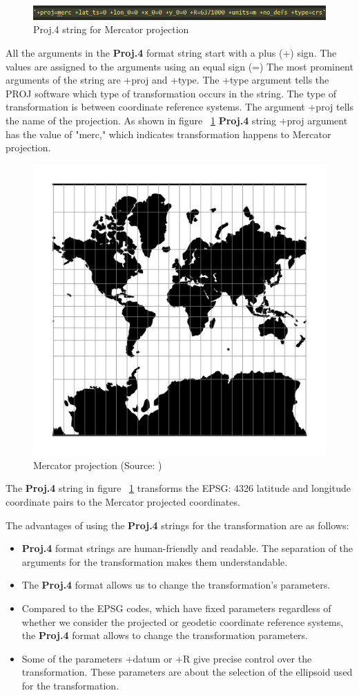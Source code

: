 \begin{figure}[H]
    \centering
    \includegraphics[width=1.0\linewidth]{figures/chapter-7/proj_string_mercator.png}
    \caption{Proj.4 string for Mercator projection}
    \label{fig:proj-string-mercator}
\end{figure}

All the arguments in the \textbf{Proj.4} format string start with a plus (+) sign. The values are assigned to the arguments using an equal sign (=) The most prominent arguments of the string are +proj and +type. The +type argument tells the PROJ software which type of transformation occurs in the string.
The type of transformation is between coordinate reference systems. The argument +proj tells the name of the projection. As shown in figure ~\ref{fig:proj-string-mercator} \textbf{Proj.4}  string +proj argument has the value of "merc," which indicates transformation happens to  Mercator projection.
\begin{figure}[H]
    \centering
    \includegraphics[width=0.5\linewidth]{figures/chapter-7/merc.png}
    \caption{Mercator projection (Source: \cite{PROJ_SITE})}
    \label{fig:mercator-projection}
\end{figure}

The \textbf{Proj.4} string in figure ~\ref{fig:proj-string-mercator} transforms the EPSG: 4326 latitude and longitude coordinate pairs to the Mercator projected coordinates.

The advantages of using the \textbf{Proj.4} strings for the transformation are as follows:
\begin{itemize}
    \item \textbf{Proj.4} format strings are human-friendly and readable. The separation of the arguments for the transformation makes them understandable.
    \item The \textbf{Proj.4} format allows us to change the transformation's parameters.
    \item Compared to the EPSG codes, which have fixed parameters regardless of whether we consider the projected or geodetic coordinate reference systems, the \textbf{Proj.4} format allows to change the transformation parameters.
    \item Some of the parameters +datum or +R give precise control over the transformation. These parameters are about the selection of the ellipsoid used for the transformation.
\end{itemize}

